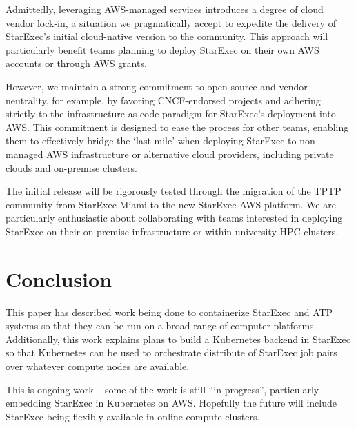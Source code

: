 \documentclass{easychair}
\begin{document}
Admittedly, leveraging AWS-managed services introduces a degree of cloud vendor lock-in, a situation we pragmatically accept to expedite the delivery of StarExec's initial cloud-native version to the community. This approach will particularly benefit teams planning to deploy StarExec on their own AWS accounts or through AWS grants.

However, we maintain a strong commitment to open source and vendor neutrality, for example, by favoring CNCF-endorsed projects and adhering strictly to the infrastructure-as-code paradigm for StarExec's deployment into AWS. This commitment is designed to ease the process for other teams, enabling them to effectively bridge the `last mile' when deploying StarExec to non-managed AWS infrastructure or alternative cloud providers, including private clouds and on-premise clusters.

The initial release will be rigorously tested through the migration of the TPTP community from StarExec Miami to the new StarExec AWS platform. We are particularly enthusiastic about collaborating with teams interested in deploying StarExec on their on-premise infrastructure or within university HPC clusters.


\section{Conclusion}
\label{Conclusion}

This paper has described work being done to containerize StarExec and ATP systems so that they 
can be run on a broad range of computer platforms.
Additionally, this work explains plans to build a Kubernetes backend in StarExec so that 
Kubernetes can be used to orchestrate distribute of StarExec job pairs over whatever compute 
nodes are available.

This is ongoing work -- some of the work is still ``in progress'', particularly embedding
StarExec in Kubernetes on AWS.
Hopefully the future will include StarExec being flexibly available in online compute clusters.



\appendix

\newpage
\end{document}
